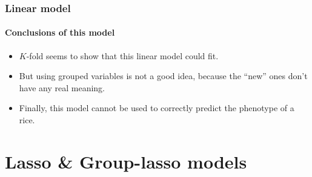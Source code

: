 \documentclass[12pt, english]{beamer}
\begin{document}
\begin{frame}
\frametitle{Linear model}
\framesubtitle{Conclusions of this model}
\begin{itemize}
    \item \(K\)-fold seems to show that this linear model could fit.
    \item But using grouped variables is not a good idea, because the ``new'' ones don't have any real meaning.
    \item Finally, this model cannot be used to correctly predict the phenotype of a rice.
\end{itemize}
\end{frame}
\section{Lasso \& Group-lasso models}
\end{document}

